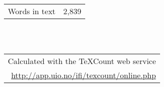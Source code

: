\documentclass[a4paper,twoside,notitlepage,11pt]{article}
\begin{document}






\null
\vfill
\begin{flushright}
	\begin{tabular}{r|l}
		Words in text	& 2,839 \\
	\end{tabular}
	\ \\
	\ \\
	\begin{tabular}{cc}
		\multicolumn{2}{r}{Calculated with the TeXCount web service}\\
		\multicolumn{2}{r}{\url{http://app.uio.no/ifi/texcount/online.php}}
	\end{tabular}
\end{flushright}

%
%
%
%

\newpage
\pagestyle{biblio}





%
%
% 
%
\newpage
\setcounter{page}{1}
\pagestyle{appendix}
\appendix



%
%
%
%
\end{document}
